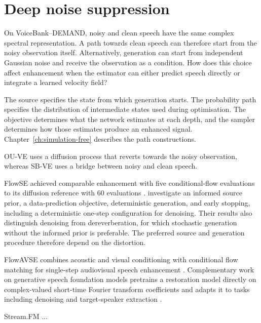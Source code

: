 \chapter{Deep noise suppression}
\label{ch:cfmse}
On VoiceBank--DEMAND, noisy and clean speech have the same complex spectral representation. A path towards clean speech can therefore start from the noisy observation itself. Alternatively, generation can start from independent Gaussian noise and receive the observation as a condition. How does this choice affect enhancement when the estimator can either predict speech directly or integrate a learned velocity field?

The source specifies the state from which generation starts. The probability path specifies the distribution of intermediate states used during optimisation. The objective determines what the network estimates at each depth, and the sampler determines how those estimates produce an enhanced signal. Chapter~\ref{ch:simulation-free} describes the path constructions.

\ac{OU-VE} uses a diffusion process that reverts towards the noisy observation, whereas \ac{SB-VE} uses a bridge between noisy and clean speech.

FlowSE achieved comparable enhancement with five conditional-flow evaluations to its diffusion reference with 60 evaluations \citep{leeFlowSEFlowMatchingbased2025}. \citet{korostikModifyingFlowMatching2025} investigate an informed source prior, a data-prediction objective, deterministic generation, and early stopping, including a deterministic one-step configuration for denoising. Their results also distinguish denoising from dereverberation, for which stochastic generation without the informed prior is preferable. The preferred source and generation procedure therefore depend on the distortion.

FlowAVSE combines acoustic and visual conditioning with conditional flow matching for single-step audiovisual speech enhancement \citep{jungFlowAVSEEfficientAudioVisual2024}. Complementary work on generative speech foundation models pretrains a restoration model directly on complex-valued short-time Fourier transform coefficients and adapts it to tasks including denoising and target-speaker extraction \citep{kuGenerativeSpeechFoundation2025}.

Stream.FM ... 


